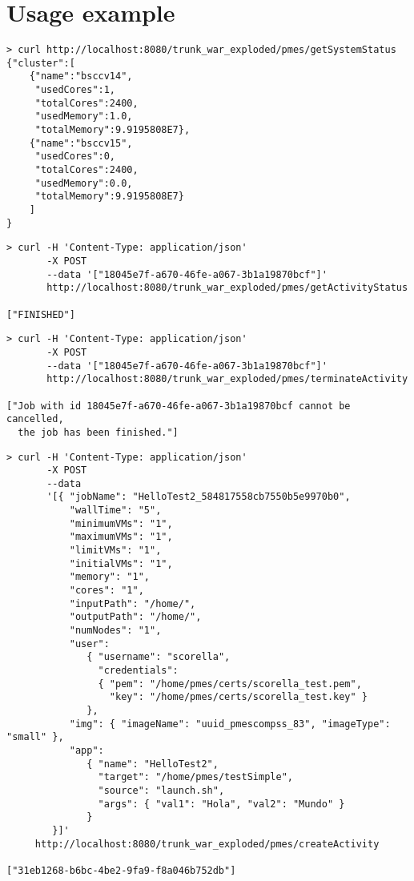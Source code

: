 \documentclass[a4paper,10pt]{article}
\begin{document}
\section{Usage example}


\begin{lstlisting}[caption=getSystemStatus]
> curl http://localhost:8080/trunk_war_exploded/pmes/getSystemStatus
{"cluster":[
    {"name":"bsccv14",
     "usedCores":1,
     "totalCores":2400,
     "usedMemory":1.0,
     "totalMemory":9.9195808E7},
    {"name":"bsccv15",
     "usedCores":0,
     "totalCores":2400,
     "usedMemory":0.0,
     "totalMemory":9.9195808E7}
    ]
}
\end{lstlisting}

\begin{lstlisting}[caption=getActivityStatus]
> curl -H 'Content-Type: application/json' 
       -X POST 
       --data '["18045e7f-a670-46fe-a067-3b1a19870bcf"]'
       http://localhost:8080/trunk_war_exploded/pmes/getActivityStatus

["FINISHED"]
\end{lstlisting}

\begin{lstlisting}[caption=terminateActivity]
> curl -H 'Content-Type: application/json'
       -X POST
       --data '["18045e7f-a670-46fe-a067-3b1a19870bcf"]'
       http://localhost:8080/trunk_war_exploded/pmes/terminateActivity

["Job with id 18045e7f-a670-46fe-a067-3b1a19870bcf cannot be cancelled,
  the job has been finished."]
\end{lstlisting}


\begin{lstlisting}[caption=createActivity]
> curl -H 'Content-Type: application/json'
       -X POST
       --data 
       '[{ "jobName": "HelloTest2_584817558cb7550b5e9970b0",
           "wallTime": "5",
           "minimumVMs": "1",
           "maximumVMs": "1",
           "limitVMs": "1",
           "initialVMs": "1",
           "memory": "1",
           "cores": "1",
           "inputPath": "/home/",
           "outputPath": "/home/",
           "numNodes": "1",
           "user": 
              { "username": "scorella",
                "credentials": 
                { "pem": "/home/pmes/certs/scorella_test.pem",
                  "key": "/home/pmes/certs/scorella_test.key" } 
              },
           "img": { "imageName": "uuid_pmescompss_83", "imageType": "small" },
           "app": 
              { "name": "HelloTest2",
                "target": "/home/pmes/testSimple",
                "source": "launch.sh",
                "args": { "val1": "Hola", "val2": "Mundo" } 
              } 
        }]'
     http://localhost:8080/trunk_war_exploded/pmes/createActivity

["31eb1268-b6bc-4be2-9fa9-f8a046b752db"]
\end{lstlisting}
\end{document}
